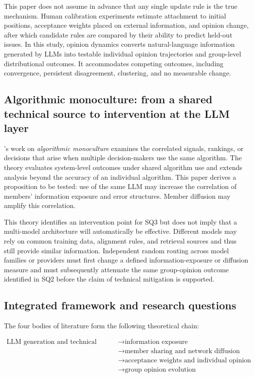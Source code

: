 \documentclass[11pt,a4paper]{article}
\newcommand{\term}[1]{\textit{#1}}
\begin{document}
This paper does not assume in advance that any single update rule is the true mechanism. Human calibration experiments estimate attachment to initial positions, acceptance weights placed on external information, and opinion change, after which candidate rules are compared by their ability to predict held-out issues. In this study, opinion dynamics converts natural-language information generated by LLMs into testable individual opinion trajectories and group-level distributional outcomes. It accommodates competing outcomes, including convergence, persistent disagreement, clustering, and no measurable change.

\subsection{Algorithmic monoculture: from a shared technical source to intervention at the LLM layer}

\citet{kleinberg2021}'s work on \term{algorithmic monoculture} examines the correlated signals, rankings, or decisions that arise when multiple decision-makers use the same algorithm. The theory evaluates system-level outcomes under shared algorithm use and extends analysis beyond the accuracy of an individual algorithm. This paper derives a proposition to be tested: use of the same LLM may increase the correlation of members' information exposure and error structures. Member diffusion may amplify this correlation.

This theory identifies an intervention point for SQ3 but does not imply that a multi-model architecture will automatically be effective. Different models may rely on common training data, alignment rules, and retrieval sources and thus still provide similar information. Independent random routing across model families or providers must first change a defined information-exposure or diffusion measure and must subsequently attenuate the same group-opinion outcome identified in SQ2 before the claim of technical mitigation is supported.

\subsection{Integrated framework and research questions}

The four bodies of literature form the following theoretical chain:

\begin{equation*}
\begin{aligned}\text{LLM generation and technical configuration} &\rightarrow \text{information exposure} \\
&\rightarrow \text{member sharing and network diffusion} \\
&\rightarrow \text{acceptance weights and individual opinion updating} \\
&\rightarrow \text{group opinion evolution}\end{aligned}
\end{equation*}
\end{document}
